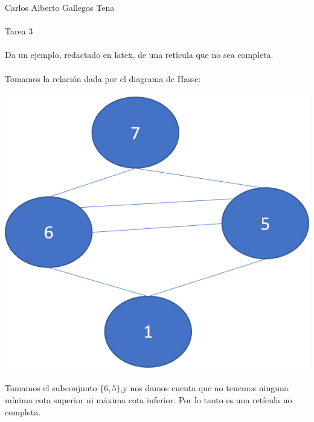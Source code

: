 \documentclass[a4paper,10pt]{article}
\title{}
\author{}
\date{}
\begin{document}
\maketitle
Carlos Alberto Gallegos Tena \\\\
Tarea 3\\\\
Da un ejemplo, redactado en latex, de una retícula que no sea completa.\\\\
Tomamos la relación dada por el diagrama de Hasse:\\\\
\includegraphics[scale=1]{D2.png}  \\\\
Tomamos el subconjunto $\{6,5\}$,y  nos damos cuenta que no tenemos ninguna mínima cota superior ni máxima cota inferior. Por lo tanto es una retícula no completa.
\end{document}
